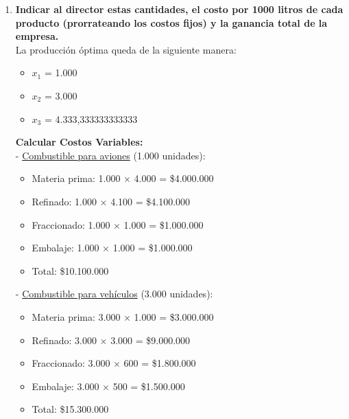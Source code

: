 \documentclass[10pt,a4paper]{article}
\begin{document}
\begin{enumerate}[label=\textbf{\sffamily\large\arabic*.}]
    \item {\bfseries\large Indicar al director estas cantidades, el costo por 1000 litros de cada producto (prorrateando los costos fijos)
     y la ganancia total de la empresa.}\\

     La producción óptima queda de la siguiente manera:

     \begin{itemize}

        \item $x_{1}$ = 1.000
        \item $x_{2}$ = 3.000
        \item $x_{3}$ = 4.333,333333333333

    \end{itemize}


     \textbf{Calcular Costos Variables:} \\

    - \underline{Combustible para aviones} (1.000 unidades):

    \begin{itemize}

        \item Materia prima: 1.000 × 4.000 = \$4.000.000
        \item Refinado: 1.000 × 4.100 = \$4.100.000
        \item Fraccionado: 1.000 × 1.000 = \$1.000.000
        \item Embalaje: 1.000 × 1.000 = \$1.000.000 \\
        \item Total: \$10.100.000

    \end{itemize}

    - \underline{Combustible para vehículos} (3.000 unidades):

    \begin{itemize}

        \item Materia prima: 3.000 × 1.000 = \$3.000.000
        \item Refinado: 3.000 × 3.000 = \$9.000.000
        \item Fraccionado: 3.000 × 600 = \$1.800.000
        \item Embalaje: 3.000 × 500 = \$1.500.000 \\
        \item Total: \$15.300.000

    \end{itemize}


\end{enumerate}
\end{document}
